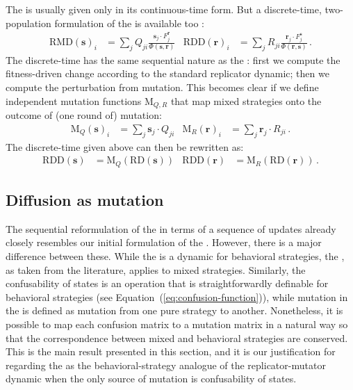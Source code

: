 \documentclass[fleqn,reqno,10pt]{article}
\renewcommand{\Smixed}{\ensuremath{\mathrm{\mathbf{s}}}}
\renewcommand{\Rmixed}{\ensuremath{\mathrm{\mathbf{r}}}}
\newcommand{\rmd}{\acro{rmd}} %
\newcommand{\rdd}{\acro{rdd}} %
\newcommand{\RD}{\ensuremath{\mathrm{RD}}} %
\newcommand{\RDD}{\ensuremath{\mathrm{RDD}}} %
\newcommand{\RMD}{\ensuremath{\mathrm{RMD}}} %
\newcommand{\Mutate}{\ensuremath{\mathrm{M}}} %
\begin{document}
The \rmd is usually given only in its continuous-time form. %
But a discrete-time, two-population formulation of the \rmd is
available too \citep[c.f.][97]{PageNowak2002:Unifying-Evolut}:
\begin{align*}
  \RMD(\Smixed)_i & = \sum_{j} Q_{ji} \frac{\Smixed_j \cdot
    F_j^{\Rmixed}}{ \Phi(\Smixed,\Rmixed)} & \RDD(\Rmixed)_i & =
  \sum_{j} R_{ji} \frac{\Rmixed_j \cdot F_j^{\Smixed}}{
    \Phi(\Rmixed,\Smixed)}\,.
\end{align*}
The discrete-time \rmd has the same sequential nature as the \rdd:
first we compute the fitness-driven change according to the standard
replicator dynamic; then we compute the perturbation from
mutation. This becomes clear if we define independent mutation
functions $\Mutate_{Q,R}$ that map mixed strategies onto the outcome
of (one round of) mutation:
\begin{align}
  \label{eq:Mutation}
  \Mutate_Q(\Smixed)_i & =  \sum_j  \Smixed_j \cdot
  Q_{ji} &   \Mutate_R(\Rmixed)_i & =  \sum_{j}  \Rmixed_j \cdot
  R_{ji} \,.
\end{align}
The discrete-time \rmd given above can then be rewritten as:
\begin{align*}
  \RDD(\Smixed) &= \Mutate_Q(\RD(\Smixed)) &   \RDD(\Rmixed) &= \Mutate_R(\RD(\Rmixed))\,. 
\end{align*}



\subsection{Diffusion as mutation}
\label{sec:diffusion-as-special}

The sequential reformulation of the \rmd in terms of a sequence of
updates already closely resembles our initial formulation of the
\rdd. However, there is a major difference between these. While the
\rdd is a dynamic for behavioral strategies, the \rmd, as taken from
the literature, applies to mixed strategies. Similarly, the
confusability of states is an operation that is straightforwardly
definable for behavioral strategies (see
Equation~(\ref{eq:confusion-function})), while mutation in the \rmd is
defined as mutation from one pure strategy to another. Nonetheless, it
is possible to map each confusion matrix to a mutation matrix in a
natural way so that the correspondence between mixed and behavioral
strategies are conserved. This is the main result presented in this
section, and it is our justification for regarding the \rdd as the
behavioral-strategy analogue of the replicator-mutator dynamic when
the only source of mutation is confusability of states.
\end{document}
